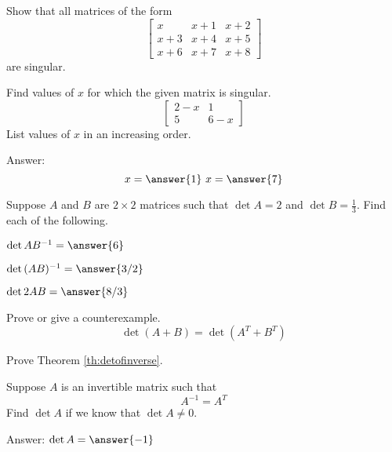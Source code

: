 \documentclass{ximera}
\begin{document}
 
\begin{problem}\label{prob:singmatrixdet2} Show that all matrices of the form
$$\begin{bmatrix}x&x+1&x+2\\x+3&x+4&x+5\\x+6&x+7&x+8\end{bmatrix}$$
are singular.
\end{problem}
 
\begin{problem}\label{prob:singmatrixdet3}
Find values of $x$ for which the given matrix is singular.
$$\begin{bmatrix}2-x&1\\5&6-x\end{bmatrix}$$
List values of $x$ in an increasing order.
 
Answer:
$$x=\answer{1}\quad x=\answer{7}$$
\end{problem}
 
\begin{problem}
Suppose $A$ and $B$ are $2\times 2$ matrices such that $\det{A}=2$ and $\det{B}=\frac{1}{3}$.  Find each of the following.
  \begin{problem}\label{prob:detproduct1a}
  $\det{AB^{-1}}=\answer{6}$
  \end{problem}
   
   \begin{problem}\label{prob:detproduct1b}
  $\det{(AB)^{-1}}=\answer{3/2}$
  \end{problem}
   
   \begin{problem}\label{prob:detproduct1c}
  $\det{2AB}=\answer{8/3}$
  \end{problem}
\end{problem}


\begin{problem}\label{prob:dettruefalse}
Prove or give a counterexample.
   $$\det{(A+B)}=\det{(A^T+B^T)}$$
   
\end{problem}
 
\begin{problem}\label{prob:proofdetofinverse}
Prove Theorem \ref{th:detofinverse}.
\end{problem}

 
 
\begin{problem}\label{prob:detinvertible1}
Suppose $A$ is an invertible matrix such that $$A^{-1}=A^T$$
Find $\det{A}$ if we know that $\det{A}\neq 0$.
 
Answer: $\det{A}=\answer{-1}$
\end{problem}
\end{document}
